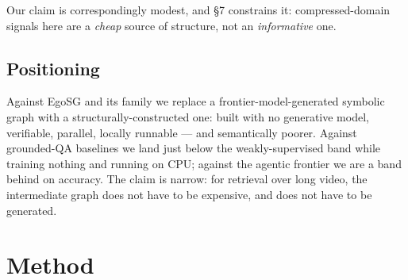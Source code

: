 \documentclass[sigconf,review,anonymous]{acmart}
\begin{document}
Our claim is correspondingly modest, and §7 constrains it: compressed-domain signals here
are a \emph{cheap} source of structure, not an \emph{informative} one.

\subsection{Positioning}

Against EgoSG and its family we replace a frontier-model-generated symbolic graph with a
structurally-constructed one: built with no generative model, verifiable, parallel, locally
runnable --- and semantically poorer. Against grounded-QA baselines we land just below the weakly-supervised band
while training nothing and running on CPU; against the agentic frontier we are a band behind
on accuracy. The claim is narrow: for
retrieval over long video, the intermediate graph does not have to be expensive, and does not
have to be generated.

\section{Method}
\end{document}

